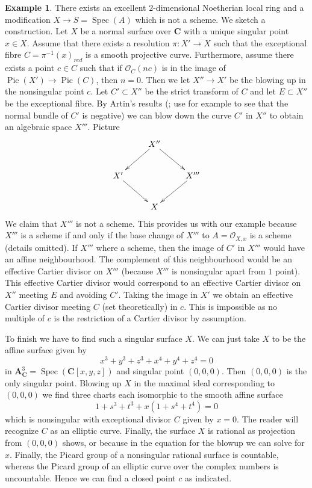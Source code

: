 \documentclass{stacks-project}
\theoremstyle{plain}
\theoremstyle{definition}
\newtheorem{example}[subsection]{Example}
\theoremstyle{remark}
\numberwithin{equation}{subsection}
\def\Spec{\mathop{\mathrm{Spec}}}
\def\Pic{\mathop{\mathrm{Pic}}\nolimits}
\begin{document}
\begin{example}
\label{example-not-blow-up}
There exists an excellent $2$-dimensional Noetherian local ring
and a modification $X \to S = \Spec(A)$ which is not a scheme.
We sketch a construction. Let $X$ be a normal surface over $\mathbf{C}$
with a unique singular point $x \in X$. Assume that there exists a
resolution $\pi : X' \to X$ such that the exceptional fibre
$C = \pi^{-1}(x)_{red}$ is a smooth projective curve. Furthermore, assume
there exists a point $c \in C$ such that if $\mathcal{O}_C(nc)$
is in the image of $\Pic(X') \to \Pic(C)$, then $n = 0$.
Then we let $X'' \to X'$ be the blowing up in the nonsingular point $c$.
Let $C' \subset X''$ be the strict transform of $C$ and let $E \subset X''$
be the exceptional fibre. By Artin's results
(\cite{ArtinII}; use for example \cite{Mumford-topology}
to see that the normal bundle of $C'$ is negative)
we can blow down the curve $C'$ in $X''$ to obtain an algebraic space $X'''$.
Picture
$$
\xymatrix{
& X'' \ar[ld] \ar[rd] \\
X' \ar[rd] &  & X''' \ar[ld] \\
& X
}
$$
We claim that $X'''$ is not a scheme. This provides us with our example
because $X'''$ is a scheme if and only if the base change of $X'''$
to $A = \mathcal{O}_{X, x}$ is a scheme (details omitted).
If $X'''$ where a scheme, then the image of $C'$ in $X'''$ would
have an affine neighbourhood. The complement of this neighbourhood
would be an effective Cartier divisor on $X'''$ (because $X'''$ is
nonsingular apart from $1$ point). This effective Cartier divisor would
correspond to an effective Cartier divisor on $X''$
meeting $E$ and avoiding $C'$. Taking the image in $X'$ we obtain
an effective Cartier divisor meeting $C$ (set theoretically) in $c$.
This is impossible as no multiple of $c$ is the restriction of a Cartier
divisor by assumption.

\medskip\noindent
To finish we have to find such a singular surface $X$. We can just take
$X$ to be the affine surface given by
$$
x^3 + y^3 + z^3 + x^4 + y^4 + z^4 = 0
$$
in $\mathbf{A}^3_\mathbf{C} = \Spec(\mathbf{C}[x, y, z])$ and singular point
$(0, 0, 0)$. Then $(0, 0, 0)$ is the only singular point. Blowing up $X$
in the maximal ideal corresponding to $(0, 0, 0)$ we find three charts each
isomorphic to the smooth affine surface
$$
1 + s^3 + t^3 + x(1 + s^4 + t^4) = 0
$$
which is nonsingular with exceptional divisor $C$ given by $x = 0$. The reader
will recognize $C$ as an elliptic curve. Finally, the surface $X$ is rational
as projection from $(0, 0, 0)$ shows, or because in the equation for the
blowup we can solve for $x$. Finally, the Picard group of a nonsingular
rational surface is countable, whereas the Picard group of an elliptic
curve over the complex numbers is uncountable. Hence we can find a closed
point $c$ as indicated.
\end{example}












\end{document}
